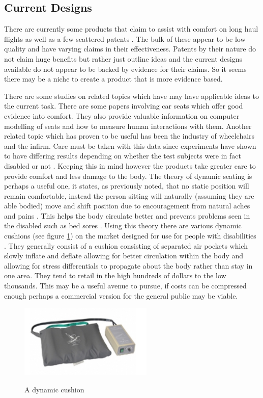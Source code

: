 \documentclass[conference]{IEEEtran}
\begin{document}
    \subsection{Current Designs}
    There are currently some products that claim to assist with comfort on long haul flights as well as a few scattered patents \cite{duncan2003inflatable, treacy1967inflatable}. The bulk of these appear to be low quality and have varying claims in their effectiveness. Patents by their nature do not claim huge benefits but rather just outline ideas and the current designs available do not appear to be backed by evidence for their claims. So it seems there may be a niche to create a product that is more evidence based.
    
    There are some studies on related topics which have may have applicable ideas to the current task. There are some papers involving car seats \cite{Verver2005, Grujicic2009} which offer good evidence into comfort. They also provide valuable information on computer modelling of seats and how to measure human interactions with them. Another related topic which has proven to be useful has been the industry of wheelchairs and the infirm. Care must be taken with this data since experiments have shown to have differing results depending on whether the test subjects were in fact disabled or not \cite{Hobson1992}. Keeping this in mind however the products take greater care to provide comfort and less damage to the body. The theory of dynamic seating is perhaps a useful one, it states, as previously noted, that no static position will remain comfortable, instead the person sitting will naturally (assuming they are able bodied) move and shift position due to encouragement from natural aches and pains \cite{Graf1993}. This helps the body circulate better and prevents problems seen in the disabled such as bed sores \cite{Stockton2008}. Using this theory there are various dynamic cushions (see figure \ref{cushion}) on the market designed for use for people with disabilities \cite{BartramAssociatesLtd2015}. They generally consist of a cushion consisting of separated air pockets which slowly inflate and deflate allowing for better circulation within the body and allowing for stress differentials to propagate about the body rather than stay in one area. They tend to retail in the high hundreds of dollars to the low thousands. This may be a useful avenue to pursue, if costs can be compressed enough perhaps a commercial version for the general public may be viable.
    
\begin{figure}[!t]
\centering
    \caption{A dynamic cushion \cite{BartramAssociatesLtd2015}}
 \includegraphics[width=2.5in]{pics/dynamicCushion.png} 
    \label{cushion}
\end{figure}
\end{document}
